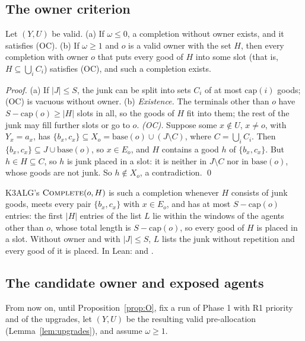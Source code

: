 \documentclass[runningheads,11pt]{llncs}
\newcommand{\capa}{\mathrm{cap}}
\newcommand{\base}{\mathrm{base}}
\newcommand{\Complete}{\textup{\textsc{Complete}}}
\begin{document}
\subsection{The owner criterion}\label{sec:ownercrit}

\begin{lemma}\label{lem:owner}
Let $(Y,U)$ be valid. (a) If $\omega\le0$, a completion without owner exists, and it satisfies (OC). (b) If $\omega\ge1$ and $o$ is a valid owner with the set $H$, then every completion with owner $o$ that puts every good of $H$ into some slot (that is, $H\subseteq\bigcup_iC_i$) satisfies (OC), and such a completion exists.
\end{lemma}

\begin{proof}
(a) If $|J|\le S$, the junk can be split into sets $C_i$ of at most $\capa(i)$ goods; (OC) is vacuous without owner.
(b) \emph{Existence.} The terminals other than $o$ have $S-\capa(o)\ge|H|$ slots in all, so the goods of $H$ fit into them; the rest of the junk may fill further slots or go to $o$.
\emph{(OC).} Suppose some $x\notin U$, $x\ne o$, with $Y_x=a_x$, has $\{b_x,c_x\}\subseteq X_o=\base(o)\cup(J\setminus C)$, where $C=\bigcup_iC_i$. Then $\{b_x,c_x\}\subseteq J\cup\base(o)$, so $x\in E_o$, and $H$ contains a good $h$ of $\{b_x,c_x\}$. But $h\in H\subseteq C$, so $h$ is junk placed in a slot: it is neither in $J\setminus C$ nor in $\base(o)$, whose goods are not junk. So $h\notin X_o$, a contradiction. \qed
\end{proof}

\noindent K3ALG's $\Complete(o,H)$ is such a completion whenever $H$ consists of junk goods, meets every pair $\{b_x,c_x\}$ with $x\in E_o$, and has at most $S-\capa(o)$ entries: the first $|H|$ entries of the list $L$ lie within the windows of the agents other than $o$, whose total length is $S-\capa(o)$, so every good of $H$ is placed in a slot. Without owner and with $|J|\le S$, $L$ lists the junk without repetition and every good of it is placed. In Lean:  and .

\subsection{The candidate owner and exposed agents}\label{sec:rexp}

From now on, until Proposition~\ref{prop:O}, fix a run of Phase 1 with R1 priority and of the upgrades, let $(Y,U)$ be the resulting valid pre-allocation (Lemma~\ref{lem:upgrades}), and assume $\omega\ge1$.
\end{document}
